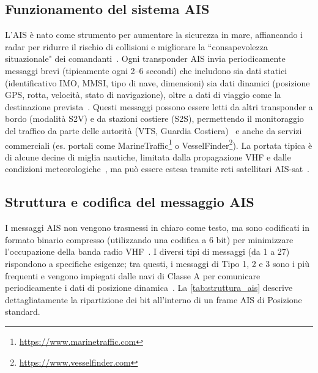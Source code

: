 \subsection{Funzionamento del sistema AIS}
\label{sec:funzionamento_ais}

L'\ac{AIS} è nato come strumento per aumentare la sicurezza in mare, affiancando i radar per ridurre il rischio di collisioni e migliorare la ``consapevolezza situazionale" dei comandanti~\cite{itu_m1371_6, solas_mtsa_2015}. Ogni transponder \ac{AIS} invia periodicamente messaggi brevi (tipicamente ogni 2--6 secondi) che includono sia dati statici (identificativo \ac{IMO}, \ac{MMSI}, tipo di nave, dimensioni) sia dati dinamici (posizione \ac{GPS}, rotta, velocità, stato di navigazione), oltre a dati di viaggio come la destinazione prevista~\cite{itu_m1371_6}. Questi messaggi possono essere letti da altri transponder a bordo (modalità \ac{S2V}) e da stazioni costiere (\ac{S2S}), permettendo il monitoraggio del traffico da parte delle autorità (\ac{VTS}, Guardia Costiera)~\cite{itu_m1371_6, solas_mtsa_2015} e anche da servizi commerciali (es. portali come MarineTraffic\footnote{\url{https://www.marinetraffic.com}} o VesselFinder\footnote{\url{https://www.vesselfinder.com}}). La portata tipica è di alcune decine di miglia nautiche, limitata dalla propagazione \ac{VHF} e dalle condizioni meteorologiche~\cite{11217861}, ma può essere estesa tramite reti satellitari \ac{AIS-sat}~\cite{itu_m1371_6}.

\subsection{Struttura e codifica del messaggio AIS}
\label{sec:struttura_messaggio_ais}

I messaggi \ac{AIS} non vengono trasmessi in chiaro come testo, ma sono codificati in formato binario compresso (utilizzando una codifica a 6 bit) per minimizzare l'occupazione della banda radio \ac{VHF}~\cite{itu_m1371_6}. I diversi tipi di messaggi (da 1 a 27) rispondono a specifiche esigenze; tra questi, i messaggi di Tipo 1, 2 e 3 sono i più frequenti e vengono impiegati dalle navi di Classe A per comunicare periodicamente i dati di posizione dinamica~\cite{itu_m1371_6}. La \cref{tab:struttura_ais} descrive dettagliatamente la ripartizione dei bit all'interno di un frame \ac{AIS} di Posizione standard.

